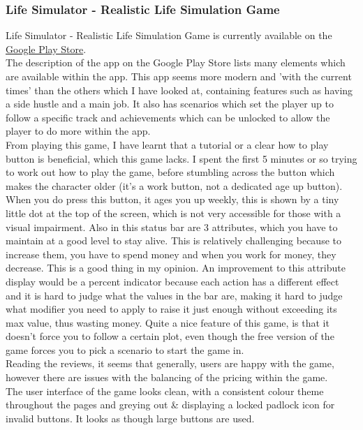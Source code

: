 \subsubsection{Life Simulator - Realistic Life Simulation Game}
Life Simulator - Realistic Life Simulation Game is currently available on the \href{https://play.google.com/store/apps/details?id=com.mindvacation.lifesimulator}{Google Play Store}.\\
The description of the app on the Google Play Store lists many elements which are available within the app. This app seems more modern and 'with the current times' than the others which I have looked at, containing features such as having a side hustle and a main job. It also has scenarios which set the player up to follow a specific track and achievements which can be unlocked to allow the player to do more within the app.\\
From playing this game, I have learnt that a tutorial or a clear how to play button is beneficial, which this game lacks. I spent the first 5 minutes or so trying to work out how to play the game, before stumbling across the button which makes the character older (it's a work button, not a dedicated age up button). When you do press this button, it ages you up weekly, this is shown by a tiny little dot at the top of the screen, which is not very accessible for those with a visual impairment. Also in this status bar are 3 attributes, which you have to maintain at a good level to stay alive. This is relatively challenging because to increase them, you have to spend money and when you work for money, they decrease. This is a good thing in my opinion. An improvement to this attribute display would be a percent indicator because each action has a different effect and it is hard to judge what the values in the bar are, making it hard to judge what modifier you need to apply to raise it just enough without exceeding its max value, thus wasting money. Quite a nice feature of this game, is that it doesn’t force you to follow a certain plot, even though the free version of the game forces you to pick a scenario to start the game in.\\
Reading the reviews, it seems that generally, users are happy with the game, however there are issues with the balancing of the pricing within the game.\\
The user interface of the game looks clean, with a consistent colour theme throughout the pages and greying out \& displaying a locked padlock icon for invalid buttons. It looks as though large buttons are used.
